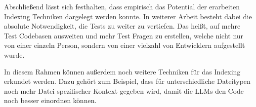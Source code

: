 \documentclass[../main.tex]{subfiles}
\begin{document}
Abschließend lässt sich festhalten, dass empirisch das Potential der erarbeiten Indexing Techniken dargelegt werden konnte.
In weiterer Arbeit besteht dabei die absolute Notwendigkeit, die Tests zu weiter zu vertiefen.
Das heißt, auf mehre Test Codebasen ausweiten und mehr Test Fragen zu erstellen, welche nicht nur von einer einzeln Person, sondern von einer vielzahl von Entwicklern aufgestellt wurde.

In diesem Rahmen können außerdem noch weitere Techniken für das Indexing erkundet werden.
Dazu gehört zum Beispiel, dass für unterschiedliche Dateitypen noch mehr Datei spezifischer Kontext gegeben wird, damit die \glspl{LLM} den Code noch besser einordnen können.
\end{document}

